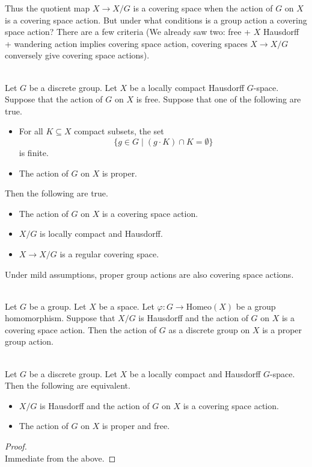 \documentclass[a4paper]{article}
\begin{document}
Thus the quotient map $X\to X/G$ is a covering space when the action of $G$ on $X$ is a covering space action. But under what conditions is a group action a covering space action? There are a few criteria (We already saw two: free + $X$ Hausdorff + wandering action implies covering space action, covering spaces $X\to X/G$ conversely give covering space actions). 

\begin{prp}{}{}\\
Let $G$ be a discrete group. Let $X$ be a locally compact Hausdorff $G$-space. Suppose that the action of $G$ on $X$ is free. Suppose that one of the following are true. 
\begin{itemize}
\item For all $K\subseteq X$ compact subsets, the set $$\{g\in G\;|\;(g\cdot K)\cap K=\emptyset\}$$ is finite. 
\item The action of $G$ on $X$ is proper. 
\end{itemize}
Then the following are true. 
\begin{itemize}
\item The action of $G$ on $X$ is a covering space action. 
\item $X/G$ is locally compact and Hausdorff. 
\item $X\to X/G$ is a regular covering space. 
\end{itemize}
\end{prp}

Under mild assumptions, proper group actions are also covering space actions. 

\begin{prp}{}{}\\
Let $G$ be a group. Let $X$ be a space. Let $\varphi:G\to\text{Homeo}(X)$ be a group homomorphism. Suppose that $X/G$ is Hausdorff and the action of $G$ on $X$ is a covering space action. Then the action of $G$ as a discrete group on $X$ is a proper group action. 
\end{prp}

\begin{crl}{}{}\\
Let $G$ be a discrete group. Let $X$ be a locally compact and Hausdorff $G$-space. Then the following are equivalent. 
\begin{itemize}
\item $X/G$ is Hausdorff and the action of $G$ on $X$ is a covering space action. 
\item The action of $G$ on $X$ is proper and free. 
\end{itemize}
\begin{proof}\\
Immediate from the above. 
\end{proof}
\end{crl}
\end{document}
